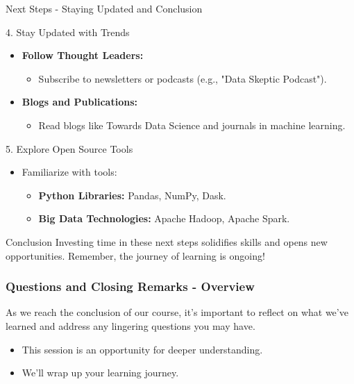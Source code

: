 \documentclass[aspectratio=169]{beamer}
\begin{document}
\begin{frame}[fragile]{Next Steps - Staying Updated and Conclusion}
    \begin{block}{4. Stay Updated with Trends}
        \begin{itemize}
            \item \textbf{Follow Thought Leaders:}
            \begin{itemize}
                \item Subscribe to newsletters or podcasts (e.g., "Data Skeptic Podcast").
            \end{itemize}
            \item \textbf{Blogs and Publications:}
            \begin{itemize}
                \item Read blogs like Towards Data Science and journals in machine learning.
            \end{itemize}
        \end{itemize}
    \end{block}

    \begin{block}{5. Explore Open Source Tools}
        \begin{itemize}
            \item Familiarize with tools:
            \begin{itemize}
                \item \textbf{Python Libraries:} Pandas, NumPy, Dask.
                \item \textbf{Big Data Technologies:} Apache Hadoop, Apache Spark.
            \end{itemize}
        \end{itemize}
    \end{block}

    \begin{block}{Conclusion}
        Investing time in these next steps solidifies skills and opens new opportunities. Remember, the journey of learning is ongoing!
    \end{block}
\end{frame}

\begin{frame}[fragile]
    \frametitle{Questions and Closing Remarks - Overview}
    As we reach the conclusion of our course, it's important to reflect on what we’ve learned and address any lingering questions you may have. 
    \begin{itemize}
        \item This session is an opportunity for deeper understanding.
        \item We'll wrap up your learning journey.
    \end{itemize}
\end{frame}
\end{document}
